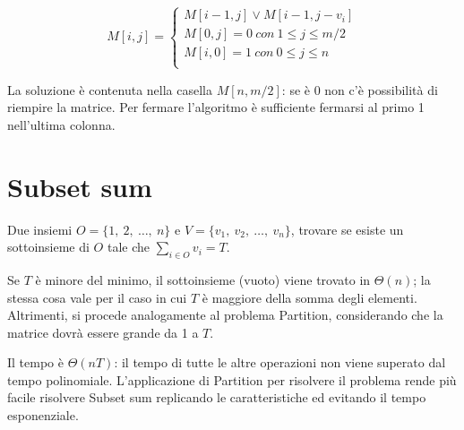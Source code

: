 $$M[i, j] = \begin{cases}
	M[i-1, j] \lor M[i-1, j-v_i] \\
	M[0, j] = 0\ con\ 1 \leq j \leq m / 2 \\
	M[i, 0] = 1\ con\ 0 \leq j \leq n \\
\end{cases}$$

La soluzione è contenuta nella casella $M[n, m/2]$: se è 0 non c'è possibilità di riempire la matrice. Per fermare l'algoritmo è sufficiente fermarsi al primo 1 nell'ultima colonna. 

\section{Subset sum}
Due insiemi $O = \{1,\ 2,\ \dots,\ n\}$ e $V = \{v_1,\ v_2,\ \dots,\ v_n\}$, trovare se esiste un sottoinsieme di $O$ tale che $\sum_{i \in O} v_i = T$.

Se $T$ è minore del minimo, il sottoinsieme (vuoto) viene trovato in $\Theta(n)$; la stessa cosa vale per il caso in cui $T$ è maggiore della somma degli elementi. \\
Altrimenti, si procede analogamente al problema Partition, considerando che la matrice dovrà essere grande da 1 a $T$. 

Il tempo è $\Theta(nT)$: il tempo di tutte le altre operazioni non viene superato dal tempo polinomiale. L'applicazione di Partition per risolvere il problema rende più facile risolvere Subset sum replicando le caratteristiche ed evitando il tempo esponenziale.
